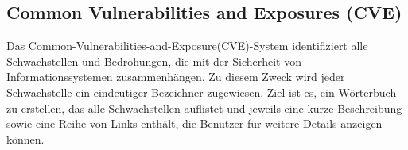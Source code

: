 \subsection{Common Vulnerabilities and Exposures (CVE)}

Das Common-Vulnerabilities-and-Exposure(CVE)-System identifiziert alle Schwachstellen und Bedrohungen, die mit der Sicherheit von Informationssystemen zusammenhängen. Zu diesem Zweck wird jeder Schwachstelle ein eindeutiger Bezeichner zugewiesen. Ziel ist es, ein Wörterbuch zu erstellen, das alle Schwachstellen auflistet und jeweils eine kurze Beschreibung sowie eine Reihe von Links enthält, die Benutzer für weitere Details anzeigen können\cite{cve18}.\\
















